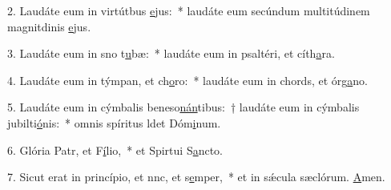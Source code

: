 2. Laudáte eum in virtútbus \uline{e}jus:~* laudáte eum secúndum multitúdinem magnitdinis \uline{e}jus.\par 
3. Laudáte eum in sno t\uline{u}bæ:~* laudáte eum in psaltéri, et cíth\uline{a}ra.\par 
4. Laudáte eum in týmpan, et ch\uline{o}ro:~* laudáte eum in chords, et órg\uline{a}no.\par 
5. Laudáte eum in cýmbalis beneso\uline{nán}tibus:~† laudáte eum in cýmbalis jubilti\uline{ó}nis:~* omnis spíritus ldet Dóm\uline{i}num.\par 
6. Glória Patr, et F\uline{í}lio,~* et Spirtui S\uline{a}ncto.\par 
7. Sicut erat in princípio, et nnc, et s\uline{e}mper,~* et in sǽcula sæclórum. \uline{A}men.\par 
